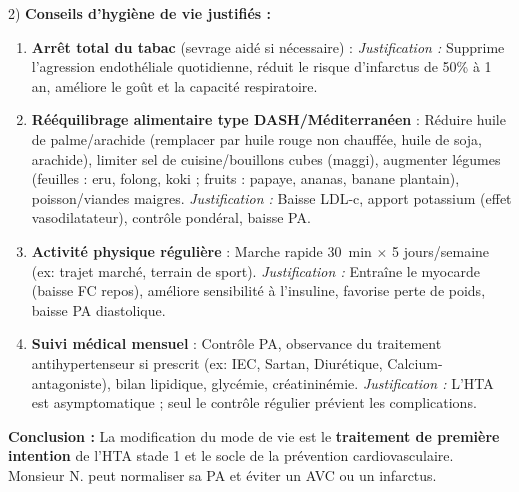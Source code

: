 \documentclass[11pt]{article}
\begin{document}
\begin{exoresolu}
2) \textbf{Conseils d'hygiène de vie justifiés :}
\begin{enumerate}
\item \textbf{Arrêt total du tabac} (sevrage aidé si nécessaire) : \textit{Justification :} Supprime l'agression endothéliale quotidienne, réduit le risque d'infarctus de 50\% à 1 an, améliore le goût et la capacité respiratoire.
\item \textbf{Rééquilibrage alimentaire type DASH/Méditerranéen} : Réduire huile de palme/arachide (remplacer par huile rouge non chauffée, huile de soja, arachide), limiter sel de cuisine/bouillons cubes (maggi), augmenter légumes (feuilles : eru, folong, koki ; fruits : papaye, ananas, banane plantain), poisson/viandes maigres. \textit{Justification :} Baisse LDL-c, apport potassium (effet vasodilatateur), contrôle pondéral, baisse PA.
\item \textbf{Activité physique régulière} : Marche rapide \SI{30}{min} $\times$ 5 jours/semaine (ex: trajet marché, terrain de sport). \textit{Justification :} Entraîne le myocarde (baisse FC repos), améliore sensibilité à l'insuline, favorise perte de poids, baisse PA diastolique.
\item \textbf{Suivi médical mensuel} : Contrôle PA, observance du traitement antihypertenseur si prescrit (ex: IEC, Sartan, Diurétique, Calcium-antagoniste), bilan lipidique, glycémie, créatininémie. \textit{Justification :} L'HTA est asymptomatique ; seul le contrôle régulier prévient les complications.
\end{enumerate}
\textbf{Conclusion :} La modification du mode de vie est le \textbf{traitement de première intention} de l'HTA stade 1 et le socle de la prévention cardiovasculaire. Monsieur N. peut normaliser sa PA et éviter un AVC ou un infarctus.
\end{exoresolu}
\end{document}
